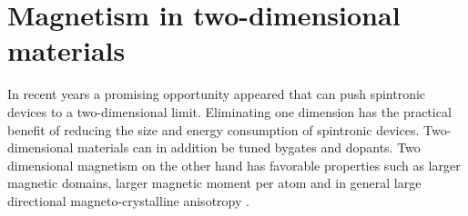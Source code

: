 



\section{Magnetism in two-dimensional materials}
In recent years a promising opportunity appeared that can push spintronic devices to a two-dimensional limit. Eliminating one dimension has the practical benefit of reducing the size and energy consumption of spintronic devices. Two-dimensional materials can in addition be tuned bygates and dopants. Two dimensional magnetism on the other hand has favorable properties such as larger magnetic domains, larger magnetic moment per atom and in general large directional magneto-crystalline anisotropy \cite{sethulakshmi_magnetism_2019, zhang_van_2019}.

